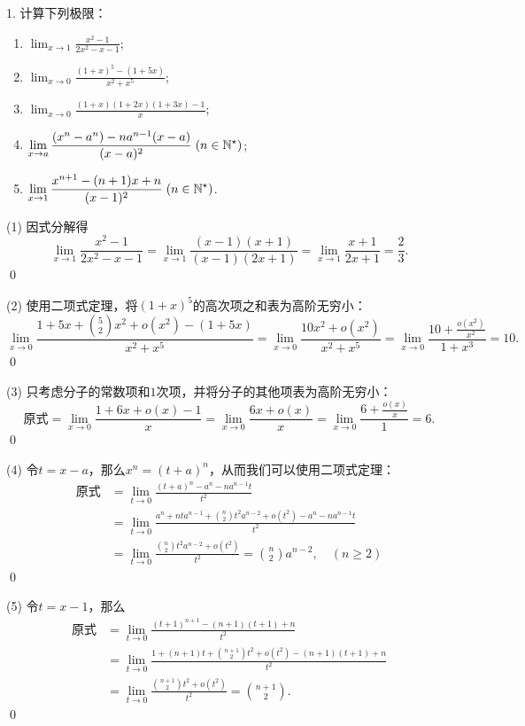 \exercise

1. 计算下列极限：
\begin{enumerate}
    \item $\displaystyle\lim_{x \to 1} \displaystyle\frac{x^2-1}{2x^2-x-1}$; 
    \item $\displaystyle\lim_{x \to 0} \displaystyle\frac{(1+x)^5-(1+5x)}{x^2+x^5}$;
\end{enumerate}
\pagebreak
\begin{enumerate}
\setcounter{enumi}{2}
    \item $\displaystyle\lim_{x \to 0} \displaystyle\frac{(1+x)(1+2x)(1+3x)-1}{x}$;
    \item $\displaystyle\lim_{x \to a} \displaystyle\frac{(x^n-a^n)-na^{n-1}(x-a)}{(x-a)^2} \; (n \in \mathbb{N}^\star)$;
    \item $\displaystyle\lim_{x \to 1} \displaystyle\frac{x^{n+1}-(n+1)x+n}{(x-1)^2} \; (n\in\mathbb{N}^\star)$.
\end{enumerate}
\bigskip

(1) \solve 因式分解得
\begin{equation}
    \lim_{x \to 1} \frac{x^2-1}{2x^2-x-1} = \lim_{x \to 1} \frac{(x-1)(x+1)}{(x-1)(2x+1)} = \lim_{x \to 1} \frac{x+1}{2x+1} = \frac{2}{3}.
\end{equation}
\qed\bigskip

(2) \solve 使用二项式定理，将$(1+x)^5$的高次项之和表为高阶无穷小：
\begin{equation}
    \lim_{x \to 0} \frac{1+5x+\binom{5}{2}x^2+o(x^2)-(1+5x)}{x^2+x^5} = \lim_{x \to 0} \frac{10x^2+o(x^2)}{x^2+x^5} = \lim_{x \to 0} \frac{10+\displaystyle\frac{o(x^2)}{x^2}}{1+x^3} = 10.
\end{equation}
\qed\bigskip

(3) \solve 只考虑分子的常数项和$1$次项，并将分子的其他项表为高阶无穷小：
\begin{equation}
    \text{原式} = \lim_{x \to 0} \frac{1 + 6x + o(x) - 1}{x} = \lim_{x \to 0} \frac{6x + o(x)}{x} = \lim_{x \to 0} \frac{6 + \displaystyle\frac{o(x)}{x}}{1} = 6.
\end{equation}
\qed\bigskip

(4) \solve 令$t = x-a$，那么$x^n = (t+a)^n$，从而我们可以使用二项式定理：
\begin{align}
    \text{原式} &= \lim_{t \to 0} \frac{(t+a)^n-a^n-na^{n-1}t}{t^2} \\
    &= \lim_{t \to 0} \frac{a^n + nt a^{n-1} + \binom{n}{2}t^2 a^{n-2} + o(t^2) - a^n - na^{n-1}t}{t^2}  \\
    &= \lim_{t \to 0} \frac{\binom{n}{2}t^2 a^{n-2}+o(t^2)}{t^2}  = \binom{n}{2}a^{n-2} , \quad (n \geq 2)
\end{align}
\qed\bigskip

(5) \solve 令$t = x-1$，那么
\begin{align}
    \text{原式} &= \lim_{t \to 0} \frac{(t+1)^{n+1}-(n+1)(t+1)+n}{t^2} \\
    &= \lim_{t \to 0} \frac{1 + (n+1)t + \binom{n+1}{2}t^2 + o(t^2) - (n+1)(t+1)+n}{t^2} \\
    &= \lim_{t \to 0} \frac{\binom{n+1}{2}t^2+o(t^2)}{t^2} = \binom{n+1}{2}.
\end{align}
\qed\bigskip